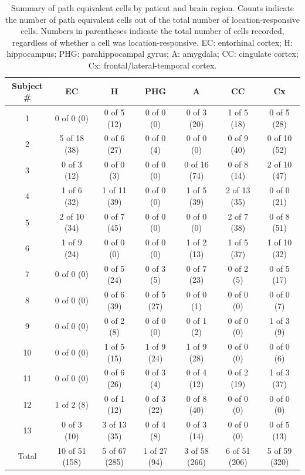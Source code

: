 \clearpage
\begin{table}
	\begin{center}
	\small
\begin{tabular}{c|cccccc}
Subject \# & EC & H & PHG & A & CC & Cx\\\hline
1 &0 of 0 (0) &0 of 5 (12) &0 of 0 (0) &0 of 3 (20) &1 of 5 (18) &0 of 5 (28)\\
2 &5 of 18 (38) &0 of 6 (27) &0 of 0 (4) &0 of 0 (0) &0 of 9 (40) &0 of 10 (52)\\
3 &0 of 3 (12) &0 of 0 (3) &0 of 0 (0) &0 of 16 (74) &0 of 8 (14) &2 of 10 (47)\\
4 &1 of 6 (32) &1 of 11 (39) &0 of 0 (0) &1 of 5 (39) &2 of 13 (35) &0 of 0 (21)\\
5 &2 of 10 (34) &0 of 7 (45) &0 of 0 (0) &0 of 0 (0) &2 of 7 (38) &0 of 8 (51)\\
6 &1 of 9 (24) &0 of 0 (0) &0 of 0 (0) &1 of 2 (13) &1 of 5 (37) &1 of 10 (32)\\
7 &0 of 0 (0) &0 of 5 (24) &0 of 3 (5) &0 of 7 (23) &0 of 2 (5) &0 of 5 (17)\\
8 &0 of 0 (0) &0 of 6 (39) &0 of 5 (27) &0 of 0 (1) &0 of 0 (0) &0 of 0 (7)\\
9 &0 of 0 (0) &0 of 2 (8) &0 of 0 (0) &0 of 1 (2) &0 of 0 (0) &1 of 3 (9)\\
10 &0 of 0 (0) &1 of 5 (15) &1 of 9 (24) &1 of 9 (28) &0 of 0 (0) &0 of 0 (6)\\
11 &0 of 0 (0) &0 of 6 (26) &0 of 3 (4) &0 of 4 (12) &0 of 2 (19) &1 of 3 (37)\\
12 &1 of 2 (8) &0 of 1 (12) &0 of 3 (22) &0 of 8 (40) &0 of 0 (0) &0 of 0 (0)\\
13 &0 of 3 (10) &3 of 13 (35) &0 of 4 (8) &0 of 3 (14) &0 of 0 (0) &0 of 5 (13)\\
\hline Total &10 of 51 (158) &5 of 67 (285) &1 of 27 (94) &3 of 58 (266) &6 of 51 (206) &5 of 59 (320)\\
\end{tabular}
\caption[Summary of path equivalent cells]{Summary of path equivalent cells by patient and brain region. Counts indicate the number of path equivalent cells out of the total number of location-responsive cells. Numbers in parentheses indicate the total number of cells recorded, regardless of whether a cell was location-responsive. EC: entorhinal cortex; H: hippocampus; PHG: parahippocampal gyrus; A: amygdala; CC: cingulate cortex; Cx: frontal/lateral-temporal  cortex.}
\end{center}
\end{table}


